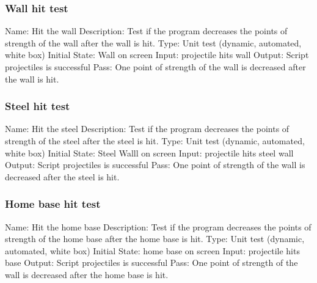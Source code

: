 \documentclass{article}
\begin{document}
\subsubsection{Wall hit test}
Name:  Hit the wall\newline
Description: Test if the program decreases the points of strength of the wall 
after the wall is hit. \newline
Type: Unit test (dynamic, automated, white box) \newline
Initial State:  Wall on screen\newline
Input: projectile hits wall\newline
Output: Script projectiles is successful  \newline
Pass:  One point of strength of the wall is decreased after the wall is hit. 
\newline

\subsubsection{Steel hit test}
Name:  Hit the steel\newline
Description: Test if the program decreases the points of strength of the steel 
after the steel is hit. \newline
Type: Unit test (dynamic, automated, white box) \newline
Initial State:  Steel Walll on screen\newline
Input: projectile hits steel wall\newline
Output: Script projectiles is successful  \newline
Pass:  One point of strength of the wall is decreased after the steel is hit. 
\newline

\subsubsection{Home base hit test}
Name:  Hit the home base\newline
Description: Test if the program decreases the points of strength of the home 
base after the home base is hit. \newline
Type: Unit test (dynamic, automated, white box) \newline
Initial State:  home base on screen\newline
Input: projectile hits base\newline
Output: Script projectiles is successful  \newline
Pass:  One point of strength of the wall is decreased after the home base is 
hit. \newline
\end{document}
